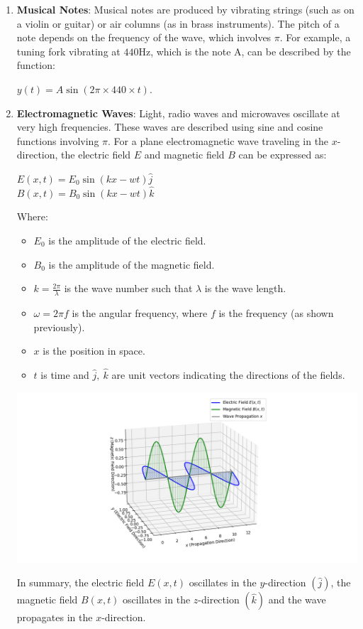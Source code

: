 \documentclass[12pt]{article}
\begin{document}
\begin{enumerate}
    \item \textbf{Musical Notes}: Musical notes are produced by vibrating strings (such as on a violin or guitar) or air columns (as in brass instruments). The pitch of a note depends on the frequency of the wave, which involves $\pi$. For example, a tuning fork vibrating at $440$Hz, which is the note A, can be described by the function:
    \begin{center}
        $y(t) = A\sin(2\pi \times 440\times t)$.
    \end{center}
    \item \textbf{Electromagnetic Waves}:
    Light, radio waves and microwaves oscillate at very high frequencies. These waves are described using sine and cosine functions involving $\pi$. For a plane electromagnetic wave traveling in the $x$-direction, the electric field $E$ and magnetic field $B$ can be expressed as:
    \begin{center}
        $E(x,t) = E_0\sin(kx - wt)\hat{j}$ \\ \vspace{3mm}
        $B(x,t) = B_0 \sin(kx - wt)\hat{k}$
    \end{center}
    Where:
    \begin{itemize}
        \item $E_0$ is the amplitude of the electric field.
        \item $B_0$ is the amplitude of the magnetic field.
        \item $k = \frac{2\pi}{\lambda}$ is the wave number such that $\lambda$ is the wave length.
        \item $\omega = 2\pi f$ is the angular frequency, where $f$ is the frequency (as shown previously).
        \item $x$ is the position in space.
        \item $t$ is time and $\hat{j}, \ \hat{k}$ are unit vectors indicating the directions of the fields.
    \end{itemize}
    \begin{center}
        \includegraphics[width=1\textwidth]{images/Figure_2.png}
    \end{center}
    \noindent In summary, the electric field $E(x,t)$ oscillates in the $y$-direction $(\hat{j})$, the magnetic field $B(x,t)$ oscillates in the $z$-direction $(\hat{k})$ and the wave propagates in the $x$-direction.
\end{enumerate}
\end{document}

